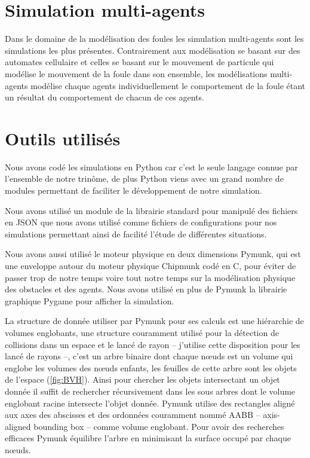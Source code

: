 \documentclass{article}
\begin{document}
\section{Simulation multi-agents}

Dans le domaine de la modélisation des foules les simulation multi-agents sont
les simulations les plus présentes. Contrairement aux modélisation se basant sur
des automates cellulaire et celles se basant sur le mouvement de particule
qui modélise le mouvement de la foule dans son ensemble, les modélisations
multi-agents modélise chaque agents individuellement le comportement de la foule
étant un résultat du comportement de chacun de ces agents.

\section{Outils utilisés}

Nous avons codé les simulations en Python car c'est le seule langage connue
par l'ensemble de notre trinôme, de plus Python viens avec un grand nombre
de modules permettant de faciliter le développement de notre simulation.

Nous avons utilisé un module de la librairie standard pour manipulé des
fichiers en JSON que nous avons utilisé comme
fichiers de configurations pour nos simulations permettant ainsi de facilité
l'étude de différentes situations.

Nous avons aussi utilisé le moteur physique en deux dimensions Pymunk,
qui est une enveloppe autour du moteur physique Chipmunk codé en C, pour
éviter de passer trop de notre temps voire tout notre temps sur la
modélisation physique des obstacles et des agents. Nous avons utilisé en
plus de Pymunk la librairie graphique Pygame pour afficher la simulation.

La structure de donnée utiliser par Pymunk pour ses calculs est une
hiérarchie de volumes englobants, une structure couramment utilisé pour la
détection de collisions dans un espace et le lancé de rayon -- j'utilise
cette disposition pour les lancé de rayons --,
c'est un arbre binaire dont chaque
nœuds est un volume qui englobe les volumes des nœuds enfants, les feuilles
de cette arbre sont les objets de l'espace (\autoref{fig:BVH}). Ainsi pour chercher les
objets intersectant un objet donnée il suffit de rechercher récursivement
dans les sous arbres dont le volume englobant racine intersecte l'objet
donnée. Pymunk utilise des rectangles aligné aux axes des abscisses et des
ordonnées couramment nommé AABB -- axis-aligned bounding box -- comme
volume englobant.
Pour avoir des recherches efficaces Pymunk équilibre l'arbre en
minimisant la surface occupé par chaque nœuds.
\end{document}
